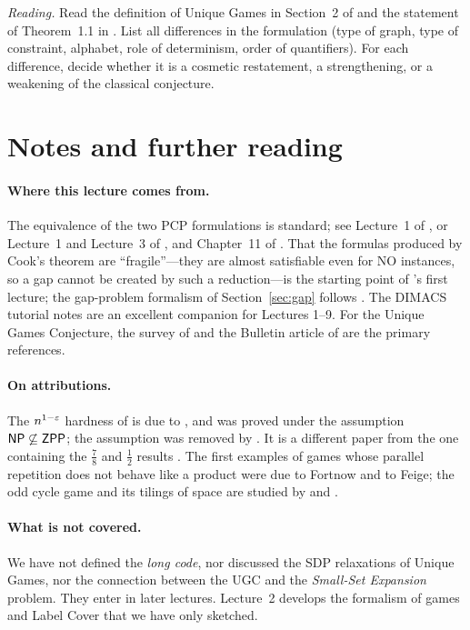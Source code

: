 \begin{exercise}[\stars{$\star\star$}]\label{ex:reading}
\emph{Reading.}  Read the definition of Unique Games in Section~2 of \citet{Khot10} and the
statement of Theorem~1.1 in \citet{OpenAI26}.  List all differences in the formulation (type of graph,
type of constraint, alphabet, role of determinism, order of quantifiers).  For each difference, decide
whether it is a cosmetic restatement, a strengthening, or a weakening of the classical conjecture.
\end{exercise}


\section*{Notes and further reading}

\paragraph{Where this lecture comes from.}
The equivalence of the two PCP formulations is standard; see Lecture~1 of \citet{Harsha07}, or
Lecture~1 and Lecture~3 of \citet{Trevisan06}, and Chapter~11 of \citet{AroraBarak09}.  That the formulas produced by
Cook's theorem are ``fragile''---they are almost satisfiable even for NO instances, so a
gap cannot be created by such a reduction---is the starting point of \citeauthor{Trevisan06}'s first lecture;
the gap-problem formalism of Section~\ref{sec:gap} follows \citet{Harsha07}.  The DIMACS tutorial notes \citep{DIMACS10} are an excellent
companion for Lectures 1--9.  For the Unique Games Conjecture, the survey of \citet{Khot10} and the
Bulletin article of \citet{Trevisan12} are the primary references.

\paragraph{On attributions.}
The $n^{1-\varepsilon}$ hardness of  is due to \citet{Hastad99}, and was proved under the
assumption $\mathsf{NP}\not\subseteq\mathsf{ZPP}$; the assumption was removed by \citet{Zuckerman07}.  It is a different
paper from the one containing the $\tfrac78$ and $\tfrac12$ results \citep{Hastad01}.  The first
examples of games whose parallel repetition does not behave like a product were due to Fortnow and to Feige;
the odd cycle game and its tilings of space are studied by \citet{FKO07} and \citet{Raz11}.

\paragraph{What is not covered.}
We have not defined the \emph{long code}, nor discussed the SDP relaxations of Unique Games, nor
the connection between the UGC and the \emph{Small-Set Expansion} problem.  They enter in later lectures.  Lecture~2 develops the formalism of games and Label Cover that we have only sketched.
